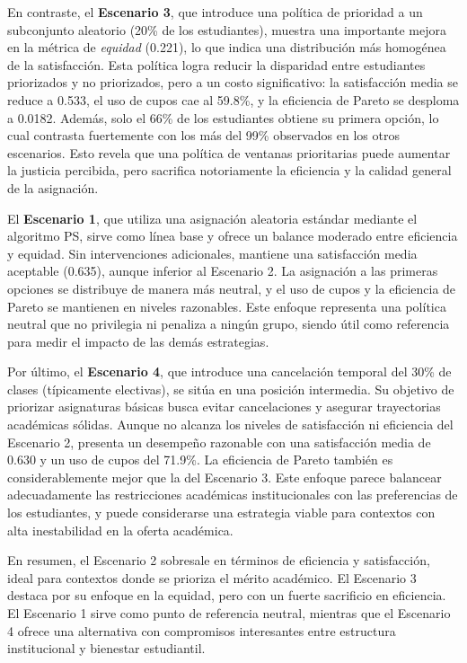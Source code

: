 \documentclass{article}
\begin{document}
En contraste, el \textbf{Escenario 3}, que introduce una política de prioridad a un subconjunto aleatorio (20\% de los estudiantes), muestra una importante mejora en la métrica de \textit{equidad} (0.221), lo que indica una distribución más homogénea de la satisfacción. Esta política logra reducir la disparidad entre estudiantes priorizados y no priorizados, pero a un costo significativo: la satisfacción media se reduce a 0.533, el uso de cupos cae al 59.8\%, y la eficiencia de Pareto se desploma a 0.0182. Además, solo el 66\% de los estudiantes obtiene su primera opción, lo cual contrasta fuertemente con los más del 99\% observados en los otros escenarios. Esto revela que una política de ventanas prioritarias puede aumentar la justicia percibida, pero sacrifica notoriamente la eficiencia y la calidad general de la asignación.

El \textbf{Escenario 1}, que utiliza una asignación aleatoria estándar mediante el algoritmo PS, sirve como línea base y ofrece un balance moderado entre eficiencia y equidad. Sin intervenciones adicionales, mantiene una satisfacción media aceptable (0.635), aunque inferior al Escenario 2. La asignación a las primeras opciones se distribuye de manera más neutral, y el uso de cupos y la eficiencia de Pareto se mantienen en niveles razonables. Este enfoque representa una política neutral que no privilegia ni penaliza a ningún grupo, siendo útil como referencia para medir el impacto de las demás estrategias.

Por último, el \textbf{Escenario 4}, que introduce una cancelación temporal del 30\% de clases (típicamente electivas), se sitúa en una posición intermedia. Su objetivo de priorizar asignaturas básicas busca evitar cancelaciones y asegurar trayectorias académicas sólidas. Aunque no alcanza los niveles de satisfacción ni eficiencia del Escenario 2, presenta un desempeño razonable con una satisfacción media de 0.630 y un uso de cupos del 71.9\%. La eficiencia de Pareto también es considerablemente mejor que la del Escenario 3. Este enfoque parece balancear adecuadamente las restricciones académicas institucionales con las preferencias de los estudiantes, y puede considerarse una estrategia viable para contextos con alta inestabilidad en la oferta académica.

En resumen, el Escenario 2 sobresale en términos de eficiencia y satisfacción, ideal para contextos donde se prioriza el mérito académico. El Escenario 3 destaca por su enfoque en la equidad, pero con un fuerte sacrificio en eficiencia. El Escenario 1 sirve como punto de referencia neutral, mientras que el Escenario 4 ofrece una alternativa con compromisos interesantes entre estructura institucional y bienestar estudiantil.
\end{document}
